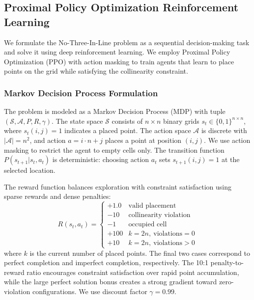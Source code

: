 \documentclass{article}
\theoremstyle{plain}
\theoremstyle{definition}
\theoremstyle{remark}
\begin{document}
\subsection{Proximal Policy Optimization Reinforcement Learning}

We formulate the No-Three-In-Line problem as a sequential decision-making task and solve it using deep reinforcement learning. We employ Proximal Policy Optimization (PPO) \cite{Schulman2017} with action masking to train agents that learn to place points on the grid while satisfying the collinearity constraint.

\subsubsection{Markov Decision Process Formulation}

The problem is modeled as a Markov Decision Process (MDP) \cite{SuttonBarto2018,Towers2024} with tuple $(\mathcal{S}, \mathcal{A}, P, R, \gamma)$. The state space $\mathcal{S}$ consists of $n \times n$ binary grids $s_t \in \{0,1\}^{n \times n}$, where $s_t(i,j) = 1$ indicates a placed point. The action space $\mathcal{A}$ is discrete with $|\mathcal{A}| = n^2$, and action $a = i \cdot n + j$ places a point at position $(i,j)$. We use action masking to restrict the agent to empty cells only. The transition function $P(s_{t+1}|s_t, a_t)$ is deterministic: choosing action $a_t$ sets $s_{t+1}(i,j) = 1$ at the selected location.

The reward function balances exploration with constraint satisfaction using sparse rewards and dense penalties:
\begin{equation}
R(s_t, a_t) = \begin{cases}
+1.0 & \text{valid placement} \\
-10 & \text{collinearity violation} \\
-1 & \text{occupied cell} \\
+100 & k = 2n,\ \mathrm{violations} = 0 \\
+10 & k = 2n,\ \mathrm{violations} > 0
\end{cases}
\end{equation}
where $k$ is the current number of placed points. The final two cases correspond to perfect completion and imperfect completion, respectively. The 10:1 penalty-to-reward ratio encourages constraint satisfaction over rapid point accumulation, while the large perfect solution bonus creates a strong gradient toward zero-violation configurations. We use discount factor $\gamma = 0.99$.
\end{document}
